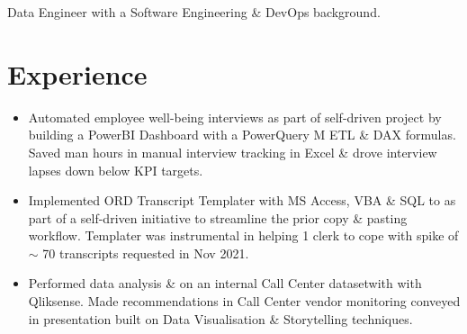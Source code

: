%
%


\fancyhead{} %


Data Engineer with a Software Engineering \& DevOps background.

\section{Experience}
\begin{itemize}
  \item Automated employee well-being interviews as part of self-driven project by
    building a PowerBI Dashboard with a PowerQuery M ETL \& DAX formulas. Saved man hours
    in manual interview tracking in Excel \& drove interview lapses down below KPI targets.

  \item Implemented ORD Transcript Templater with MS Access, VBA \& SQL to as part
    of a self-driven initiative to streamline the prior copy \& pasting workflow.
    Templater was instrumental in helping 1 clerk to cope with spike of $\sim$ 
    70 transcripts requested in Nov 2021.

  \item Performed data analysis \& on an internal Call Center datasetwith
    with Qliksense. Made recommendations in Call Center vendor monitoring 
    conveyed in presentation built on Data Visualisation \& Storytelling techniques.
\end{itemize}

